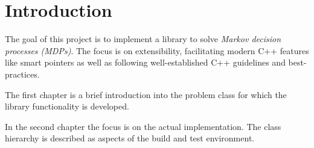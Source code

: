 \chapter{Introduction}


The goal of this project is to implement a library to solve \emph{Markov decision processes (MDPs)}. The focus is on extensibility, facilitating modern C++ features like smart pointers as well as following well-established C++ guidelines and best-practices. 

The first chapter is a brief introduction into the problem class for which the library functionality is developed.  

In the second chapter the focus is on the actual implementation. The class hierarchy is described as aspects of the build and test environment. 
